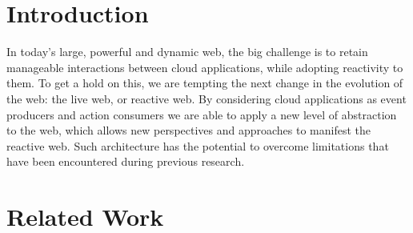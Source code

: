 \documentclass[11pt]{article}%
\begin{document}
\section{Introduction}
In today's large, powerful and dynamic web, the big challenge is to retain manageable interactions between cloud applications, while adopting reactivity to them. To get a hold on this, we are tempting the next change in the evolution of the web: the live web, or reactive web. By considering cloud applications as event producers and action consumers we are able to apply a new level of abstraction to the web, which allows new perspectives and approaches to manifest the reactive web. Such architecture has the potential to overcome limitations that have been encountered during previous research.

\section{Related Work}
\end{document}
